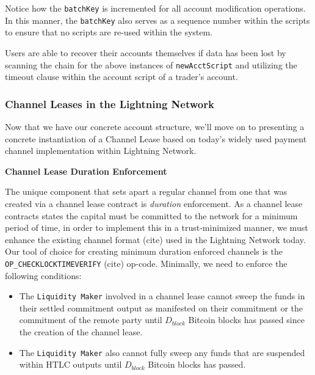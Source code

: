 \documentclass[10pt,a4paper]{article}
\theoremstyle{definition}
\begin{document}
Notice how the \texttt{batchKey} is incremented for all account modification
operations. In this manner, the \texttt{batchKey} also serves as a sequence
number within the scripts to ensure that no scripts are re-used within the
system. 

Users are able to recover their accounts themselves if data has been lost by
scanning the chain for the above instances of \texttt{newAcctScript} and
utilizing the timeout clause within the account script of a trader's account.


\subsubsection{Channel Leases in the Lightning Network}

Now that we have our concrete account structure, we'll move on to presenting a
concrete instantiation of a Channel Lease based on today's widely used payment
channel implementation within Lightning Network. \\

\begin{center}
    \textbf{Channel Lease Duration Enforcement}
\end{center}

The unique component that sets apart a regular channel from one that was
created via a channel lease contract is \emph{duration} enforcement. As a
channel lease contracts states the capital must be committed to the network for
a minimum period of time, in order to implement this in a trust-minimized
manner, we must enhance the existing channel format (cite) used in the
Lightning Network today. Our tool of choice for creating minimum duration
enforced channels is the \texttt{OP\_CHECKLOCKTIMEVERIFY} (cite) op-code.
Minimally, we need to enforce the following conditions:
\begin{itemize}
    \item The \texttt{Liquidity Maker} involved in a channel lease cannot sweep
        the funds in their settled commitment output as manifested on their
        commitment or the commitment of the remote party until $D_{block}$
        Bitcoin blocks has passed since the creation of the channel lease.
    \item The \texttt{Liquidity Maker} also cannot fully sweep any funds that
        are suspended within HTLC outputs until $D_{block}$ Bitcoin blocks has
        passed.
\end{itemize}
\end{document}
